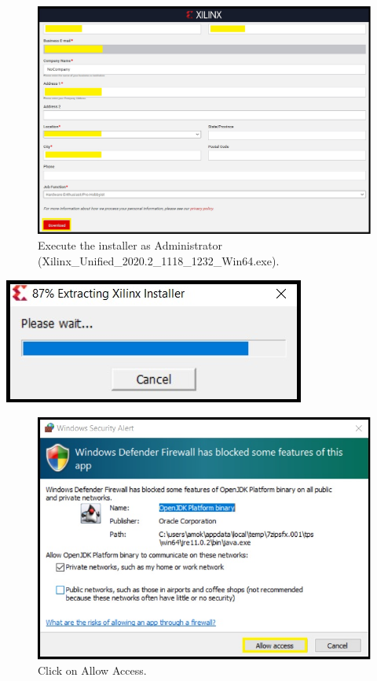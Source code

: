 \begin{figure}[H]
\centering
  \includegraphics[width=0.8\linewidth]{images/VivadoInstimg005.jpg}
  \captionsetup{width=0.8\linewidth}
  \caption{Execute the installer as Administrator (Xilinx\_Unified\_2020.2\_1118\_1232\_Win64.exe).}
  \label{fig:VivadoInstimg005}
\end{figure}

\includegraphics[width=\linewidth]{images/VivadoInstimg006.jpg}

\begin{figure}[H]
\centering
  \includegraphics[width=0.8\linewidth]{images/VivadoInstimg007.jpg}
  \captionsetup{width=0.8\linewidth}
  \caption{Click on Allow Access.}
  \label{fig:VivadoInstimg007}
\end{figure}

